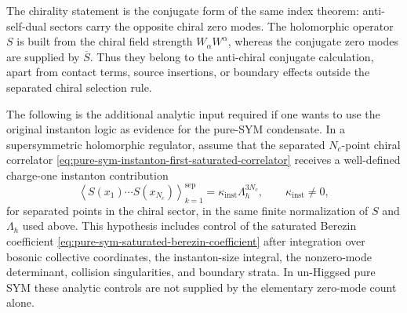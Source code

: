 The chirality statement is the conjugate form of the same index theorem:
anti-self-dual sectors carry the opposite chiral zero modes.  The holomorphic
operator \(S\) is built from the chiral field strength \(W_\alpha W^\alpha\),
whereas the conjugate zero modes are supplied by \(\overline S\).  Thus they
belong to the anti-chiral conjugate calculation, apart from contact terms,
source insertions, or boundary effects outside the separated chiral
selection rule.

\begin{hypothesis}
\label{hyp:pure-sym-zero-mode-saturated-instanton-correlator}
The following is the additional analytic input required if one wants to use
the original instanton logic as evidence for the pure-SYM condensate.  In a
supersymmetric holomorphic regulator, assume that the separated
\(N_c\)-point chiral correlator
\eqref{eq:pure-sym-instanton-first-saturated-correlator} receives a
well-defined charge-one instanton contribution
\begin{equation}
  \left\langle S(x_1)\cdots S(x_{N_c})\right\rangle_{k=1}^{\mathrm{sep}}
  =
  \kappa_{\mathrm{inst}}\Lambda_h^{3N_c},
  \qquad \kappa_{\mathrm{inst}}\neq0 ,
  \label{eq:pure-sym-zero-mode-saturated-correlator-input}
\end{equation}
for separated points in the chiral sector, in the same finite normalization
of \(S\) and \(\Lambda_h\) used above.  This hypothesis includes control of
the saturated Berezin coefficient
\eqref{eq:pure-sym-saturated-berezin-coefficient} after integration over
bosonic collective coordinates, the instanton-size integral, the nonzero-mode
determinant, collision singularities, and boundary strata.  In un-Higgsed
pure SYM these analytic controls are not supplied by the elementary zero-mode
count alone.
\end{hypothesis}


